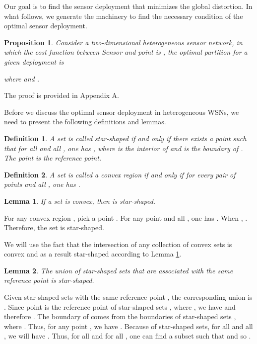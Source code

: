 \documentclass[journal,draftcls,onecolumn,12pt,twoside, narroweqnarray]{IEEEtran}
\newtheorem{prop}{Proposition}
\newtheorem{Def}{Definition}
\newtheorem{Lemma}{Lemma}
\begin{document}
Our goal is to find the sensor deployment that minimizes the global distortion. In what follows, we generate the machinery to find the necessary condition of the optimal sensor deployment.

\begin{prop}
\label{Proposition.1}
Consider a two-dimensional heterogeneous sensor network, in which the cost function between Sensor  and point  is , the optimal partition for a given deployment  is

where  and .
\end{prop}
\begin{IEEEproof}
The proof is provided in Appendix A.
\end{IEEEproof}
Before we discuss the optimal sensor deployment in heterogeneous WSNs, we need to present the following definitions and lemmas.
\begin{Def}
A set  is called star-shaped if and only if there exists a point  such that for all  and all , one has , where  is the interior of  and  is the boundary of . The point  is the reference point.
\end{Def}
\begin{Def}
A set  is called a convex region if and only if for every pair of points  and all , one has .
\end{Def}
\begin{Lemma}
\label{a}
If a set  is convex, then  is star-shaped.
\end{Lemma}
\begin{IEEEproof}
For any convex region , pick a point . For any point  and all , one has . When , . Therefore, the set  is star-shaped.
\end{IEEEproof}
We will use the fact that the intersection of any collection of convex sets is convex \cite{Convexity,ACA} and as a result star-shaped according to Lemma \ref{a}.
\begin{Lemma}
\label{b}
The union of star-shaped sets that are associated with the same reference point  is star-shaped.
\end{Lemma}
\begin{IEEEproof}
Given  star-shaped sets  with the same reference point , the corresponding union is . Since point  is the reference point of star-shaped sets , where , we have  and therefore . The boundary of  comes from the boundaries of  star-shaped sets , where . Thus, for any point , we have . Because of  star-shaped sets, for all  and all , we will have . Thus, for all  and for all , one can find a subset  such that  and so .
\end{IEEEproof}
\end{document}
